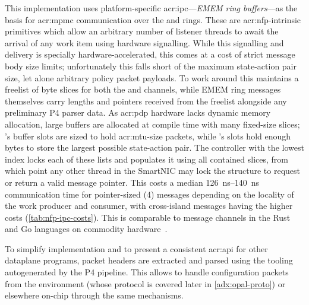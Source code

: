 This implementation uses platform-specific \gls{acr:ipc}---\emph{EMEM ring buffers}---as the basis for \gls{acr:mpmc} communication over the \inring{} and \outring{} rings.
These are \gls{acr:nfp}-intrinsic primitives which allow an arbitrary number of listener threads to await the arrival of any work item using hardware signalling.
While this signalling and delivery is specially hardware-accelerated, this comes at a cost of strict message body size limits; unfortunately this falls short of the maximum state-action pair size, let alone arbitrary policy packet payloads.
To work around this \approachshort{} maintains a freelist of byte slices for both the \inring{} and \outring{} channels, while EMEM ring messages themselves carry lengths and pointers received from the freelist alongside any preliminary P4 parser data.
As \gls{acr:pdp} hardware lacks dynamic memory allocation, large buffers are allocated at compile time with many fixed-size slices; \inring{}'s buffer slots are sized to hold \gls{acr:mtu}-size packets, while \outring{}'s slots hold enough bytes to store the largest possible state-action pair.
The \approachshort{} controller with the lowest index locks each of these lists and populates it using all contained slices, from which point any other thread in the SmartNIC may lock the structure to request or return a valid message pointer.
This costs a median \qtyrange{126}{140}{\nano\second} communication time for pointer-sized (\qty{4}{\byte}) messages depending on the locality of the work producer and consumer, with cross-island messages having the higher costs (\cref{tab:nfp-ipc-costs}).
This is comparable to message channels in the Rust and Go languages on commodity hardware~\parencite{gochans-perf}.

To simplify implementation and to present a consistent \gls{acr:api} for other dataplane programs, packet headers are extracted and parsed using the tooling autogenerated by the P4 pipeline.
This allows \approachshort{} to handle configuration packets from the environment (whose protocol is covered later in \cref{adx:opal-proto}) or elsewhere on-chip through the same mechanisms.



